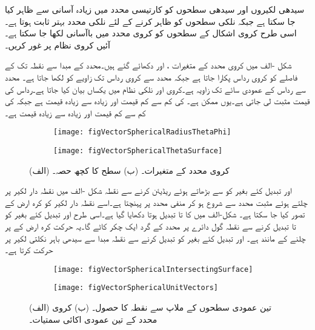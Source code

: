 سیدھی لکیروں اور سیدھی سطحوں کو کارتیسی محدد میں زیادہ آسانی سے ظاہر کیا جا سکتا ہے جبکہ نلکی سطحوں کو ظاہر کرنے کے لئے نلکی محدد بہتر ثابت ہوتا ہے۔اسی طرح کروی اشکال کے سطحوں کو کروی محدد میں باآسانی لکھا جا سکتا ہے۔آئیں کروی نظام پر غور کریں۔

شکل -الف میں کروی محدد کے متغیرات ،  اور  دکھائے گئے ہیں۔محدد کے مبدا سے نقطہ  تک کے فاصلے  کو کروی رداس پکارا جاتا ہے جبکہ  محدد سے کروی رداس تک زاویے کو  لکھا جاتا ہے۔ محدد سے رداس کے عمودی سائے تک زاویہ  ہے۔کروی اور نلکی نظام میں  یکساں بیان کیا جاتا ہے۔رداس کی  قیمت مثبت لی جاتی ہے۔یوں  ممکن ہے۔ کی کم سے کم قیمت  اور  زیادہ سے زیادہ  قیمت  ہے جبکہ  کی کم سے کم قیمت  اور زیادہ سے زیادہ قیمت  ہے۔

\begin{figure}
\centering
\begin{subfigure}{0.5\textwidth}
\centering
\texttt{[image: figVectorSphericalRadiusThetaPhi]}
\end{subfigure}%
%
\begin{subfigure}{0.5\textwidth}
\centering
\texttt{[image: figVectorSphericalThetaSurface]}
\end{subfigure}%
\caption{(الف) کروی محدد کے متغیرات۔ (ب)  سطح  کا کچھ حصہ۔}
\label{شکل_سمتیہ_کروی_محدد_متغیرات}
\end{figure}
%
 اور  تبدیل کئے بغیر  کو  سے بڑھاتے ہوئے  ریڈیئن  کرنے سے نقطہ   شکل -الف میں نقطہ دار لکیر پر چلتے ہوئے  مثبت  محدد سے شروع ہو کر  منفی  محدد پر پہنچتا ہے۔اسے  نقطہ دار لکیر کو  کرہ ارض کے  تصور  کیا جا سکتا ہے۔  شکل-الف میں  کا  تا  تبدیل ہوتا دکھایا گیا ہے۔اسی طرح  اور  تبدیل کئے بغیر  کو  تا  تبدیل کرنے سے  نقطہ  گول دائرے پر  محدد کے گرد ایک چکر کاٹے گا۔یہ حرکت کرہ ارض کے  پر چلنے کے  مانند ہے۔ اور  تبدیل کئے بغیر  کو تبدیل کرنے سے نقطہ  مبدا سے  سیدھی باہر نکلتی لکیر پر حرکت کرتا ہے۔ 

\begin{figure}
\centering
\begin{subfigure}{0.5\textwidth}
\centering
\texttt{[image: figVectorSphericalIntersectingSurface]}
\end{subfigure}%
%
\begin{subfigure}{0.5\textwidth}
\centering
\texttt{[image: figVectorSphericalUnitVectors]}
\end{subfigure}%
\caption{(الف) تین عمودی سطحوں کے ملاپ سے نقطہ  کا حصول۔ (ب) کروی محدد کے تین عمودی اکائی سمتیات۔}
\label{شکل_سمتیہ_کروی_تین_سطحوں_کا_ملاپ}
\end{figure}

